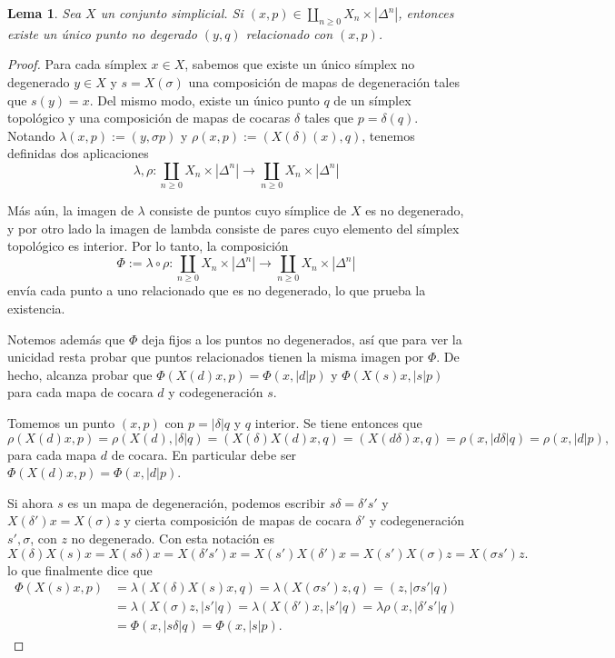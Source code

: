 \documentclass[11pt]{report}
\theoremstyle{colored}
\newtheorem{lemma}{Lema}[section]
\renewcommand{\ss}[1]{\Delta^{#1}}
\begin{document}
\begin{lemma}\label{uniq-pt-nodeg} Sea $X$ un conjunto simplicial. Si $(x,p) \in \coprod_{n \geq 0} X_n \times |\ss{n}|$, entonces existe un único punto no degerado $(y,q)$ relacionado con $(x,p)$.
\end{lemma}
\begin{proof} Para cada símplex $x \in X$, sabemos que existe un único símplex no degenerado $y \in X$ y $s = X(\sigma)$ una composición de mapas de degeneración tales que $s(y) = x$. Del mismo modo, existe un único punto $q$ de un símplex topológico y una composición de mapas de cocaras $\delta$ tales que $p = \delta(q)$. Notando $\lambda(x,p) := (y,\sigma p)$ y $\rho(x,p) := (X(\delta)(x),q)$, tenemos definidas dos aplicaciones
\[
\lambda, \rho : \coprod_{n \geq 0} X_n \times |\ss{n}| \to \coprod_{n \geq 0} X_n \times |\ss{n}|
\] 

Más aún, la imagen de $\lambda$ consiste de puntos cuyo símplice de $X$ es no degenerado, y por otro lado la imagen de lambda consiste de pares cuyo elemento del símplex topológico es interior. Por lo tanto, la composición
\[
\Phi := \lambda \circ \rho : \coprod_{n \geq 0} X_n \times |\ss{n}| \to \coprod_{n \geq 0} X_n \times |\ss{n}|
\]
envía cada punto a uno relacionado que es no degenerado, lo que prueba la existencia.

Notemos además que $\Phi$ deja fijos a los puntos no degenerados, así que para ver la unicidad resta probar que puntos relacionados tienen la misma imagen por $\Phi$. De hecho, alcanza probar que  $\Phi(X(d)x,p) = \Phi(x,|d|p)$ y $\Phi(X(s)x,|s|p)$ para cada mapa de cocara $d$ y codegeneración $s$. 

Tomemos un punto $(x,p)$ con $p = |\delta|q$ y $q$ interior. Se tiene entonces que
\[
\rho(X(d)x,p) = \rho(X(d),|\delta|q) = (X(\delta)X(d)x,q) = (X(d\delta)x,q) = \rho(x,|d\delta|q) = \rho(x,|d|p),
\]
para cada mapa $d$ de cocara. En particular debe ser $\Phi(X(d)x,p) = \Phi(x,|d|p)$. 

Si ahora $s$ es un mapa de degeneración, podemos escribir $s\delta = \delta's'$ y $X(\delta')x = X(\sigma)z$ y cierta composición de mapas de cocara $\delta'$ y codegeneración $s',\sigma$, con $z$ no degenerado. Con esta notación es
\[
X(\delta)X(s)x = X(s\delta)x = X(\delta's')x = X(s')X(\delta')x = X(s')X(\sigma)z = X(\sigma s')z.
\]
lo que finalmente dice que
\begin{align*}
\Phi(X(s)x,p) &= \lambda(X(\delta)X(s)x,q) = \lambda(X(\sigma s')z,q) = (z,|\sigma s'|q)\\
&= \lambda(X(\sigma)z,|s'|q) = \lambda(X(\delta')x,|s'|q) = \lambda\rho(x,|\delta's'|q)\\
&= \Phi(x,|s\delta|q) = \Phi(x,|s|p).
\end{align*}
\end{proof}
\end{document}
